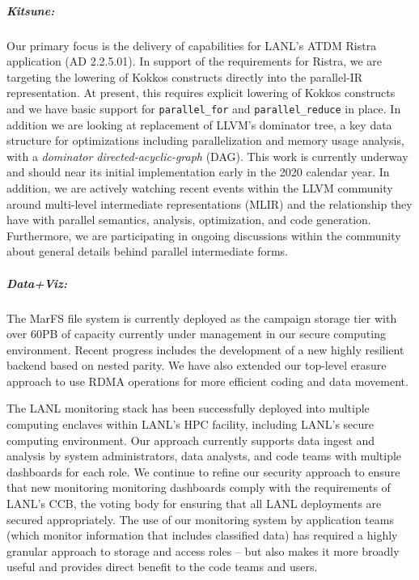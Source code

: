 \subparagraph{Kitsune:}
Our primary focus is the delivery of capabilities for LANL's ATDM
Ristra application (AD 2.2.5.01).  In support of the requirements for
Ristra, we are targeting the lowering of Kokkos constructs directly
into the parallel-IR representation.  At present, this requires
explicit lowering of Kokkos constructs and we have basic support
for \texttt{parallel\_for} and \texttt{parallel\_reduce} in place.  In
addition we are looking at replacement of LLVM's dominator tree, a key
data structure for optimizations including parallelization and
memory usage analysis, with a \emph{dominator directed-acyclic-graph}
(DAG).  This work is currently underway and should near its initial
implementation early in the 2020 calendar year.  In addition, we are
actively watching recent events within the LLVM community around
multi-level intermediate representations (MLIR) and the relationship
they have with parallel semantics, analysis, optimization, and code
generation.  Furthermore, we are participating in ongoing discussions within the
community about general details behind parallel intermediate forms. 



\subparagraph{Data+Viz:}
The MarFS file system is currently deployed as the campaign storage tier
with over 60PB of capacity currently under management in our secure computing
environment. Recent progress includes the development of a new highly
resilient backend based on nested parity. We have also extended our top-level
erasure approach to use RDMA operations for more efficient coding and data movement.

The LANL monitoring stack has been successfully deployed into multiple
computing enclaves within LANL's HPC facility, including LANL's secure
computing environment. Our approach currently supports data ingest and
analysis by system administrators, data analysts, and code teams with multiple
dashboards for each role. We continue to refine our security approach to
ensure that new monitoring monitoring dashboards comply with the requirements
of LANL's CCB, the voting body for ensuring that all LANL deployments are
secured appropriately. The use of our monitoring system by application teams
(which monitor information that includes classified data) has required a
highly granular approach to storage and access roles -- but also makes it more
broadly useful and provides direct benefit to the code teams and users.


